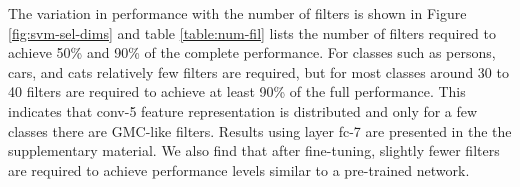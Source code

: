 \setlength{\tabcolsep}{1pt}
\begin{table}[t!]
\renewcommand{\arraystretch}{1.2}
\begin{center}
\caption{Number of filters required to achieve 50\%, 90\% of the complete performance on PASCAL-DET-GT using a CNN pre-trained on Imagenet and fine-tuned for PASCAL-DET using conv-5 features.}
\label{table:num-fil}
\end{center}
\end{table}
\setlength{\tabcolsep}{1.4pt}
  
The variation in performance with the number of filters is shown in Figure \ref{fig:svm-sel-dims} and table \ref{table:num-fil} lists the number of filters required to achieve 50\% and 90\% of the complete performance. For classes such as persons, cars, and cats relatively few filters are required, but for most classes around 30 to 40 filters are required to achieve at least 90\% of the full performance. This indicates that conv-5 feature representation is distributed and only for a few classes there are GMC-like filters.
Results using layer fc-7 are presented in the the supplementary material.
We also find that after fine-tuning, slightly fewer filters are required to achieve performance levels similar to a pre-trained network. 

